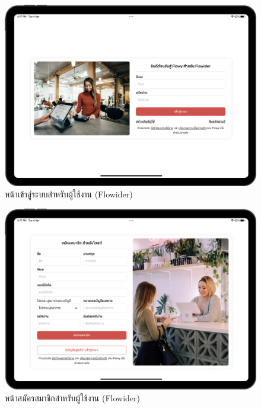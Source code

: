 \begin{figure}[ht]
    \begin{center}
    \includegraphics[width=5.5in]{./image/Flowider_login.png}
    \end{center}
    \caption[Flowider login]{หน้าเข้าสู่ระบบสำหรับผู้ใช้งาน (Flowider)}
    \label{fig:Flowider_login}
\end{figure}
\begin{figure}[ht]
    \begin{center}
    \includegraphics[width=5.5in]{./image/Flowider_register.png}
    \end{center}
    \caption[Flowider register]{หน้าสมัครสมาชิกสำหรับผู้ใช้งาน (Flowider)}
    \label{fig:Flowider_register}
\end{figure}
